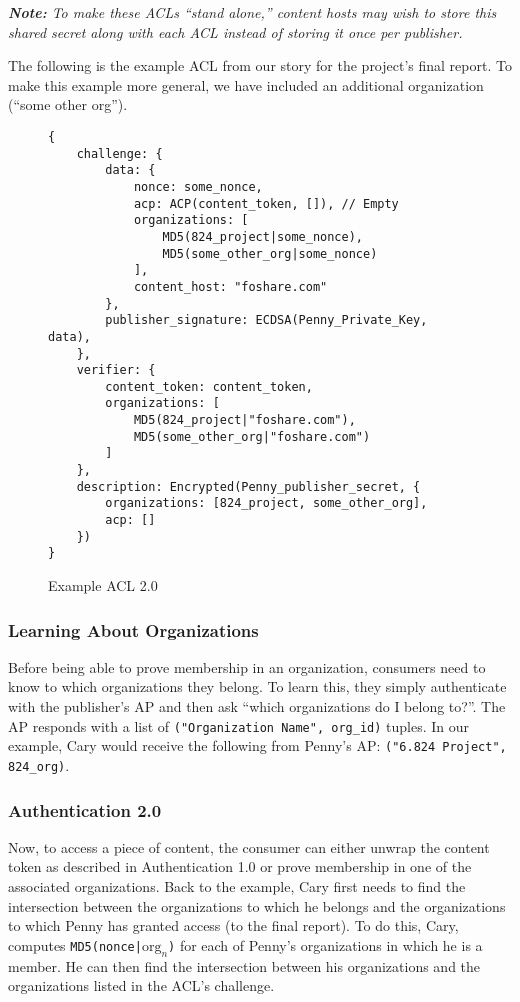 \documentclass[pdftex,12pt,a4papaer]{article}
\newcommand{\note}[1]{\textit{\textbf{Note:} #1}}
\begin{document}
\note{To make these ACLs ``stand alone,'' content hosts may wish to store this
shared secret along with each ACL instead of storing it once per publisher.}


The following is the example ACL from our story for the project's final report.
To make this example more general, we have included an additional organization
(``some other org'').

\begin{figure}[H]
\begin{verbatim}
{
    challenge: {
        data: {
            nonce: some_nonce,
            acp: ACP(content_token, []), // Empty
            organizations: [
                MD5(824_project|some_nonce),
                MD5(some_other_org|some_nonce)
            ],
            content_host: "foshare.com"
        },
        publisher_signature: ECDSA(Penny_Private_Key, data),
    },
    verifier: {
        content_token: content_token,
        organizations: [
            MD5(824_project|"foshare.com"),
            MD5(some_other_org|"foshare.com")
        ] 
    },
    description: Encrypted(Penny_publisher_secret, {
        organizations: [824_project, some_other_org],
        acp: []
    })
}
\end{verbatim}
\caption{Example ACL 2.0}
\end{figure}

\subsubsection{Learning About Organizations}

Before being able to prove membership in an organization, consumers need to know
to which organizations they belong. To learn this, they simply authenticate with
the publisher's AP and then ask ``which organizations do I belong to?''. The AP
responds with a list of \texttt{("Organization Name", org\_id)} tuples. In our
example, Cary would receive the following from Penny's AP:
\texttt{("6.824 Project", 824\_org)}.

\subsubsection{Authentication 2.0}

Now, to access a piece of content, the consumer can either unwrap the content
token as described in Authentication 1.0 or prove membership in one of the
associated organizations. Back to the example, Cary first needs to find the
intersection between the organizations to which he belongs and the organizations
to which Penny has granted access (to the final report). To do this, Cary,
computes \texttt{MD5(nonce|$\text{org}_n$)} for each of Penny's organizations in
which he is a member. He can then find the intersection between his
organizations and the organizations listed in the ACL's challenge.
\end{document}
